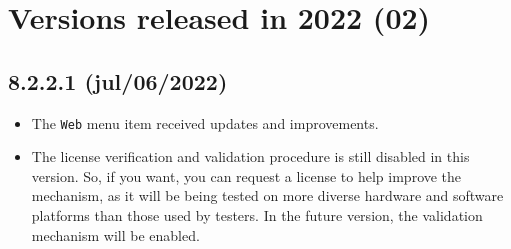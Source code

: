 
\hypertarget{2022}{}
\section{Versions released in 2022 (02)}

\subsection*{8.2.2.1 (jul/06/2022)}
\begin{itemize}
  \item The \texttt{Web} menu item received updates and improvements.
  \item The license verification and validation procedure is still disabled in this version.
    So, if you want, you can request a license to help improve the mechanism,
    as it will be being tested on more diverse hardware and software platforms than
    those used by testers. In the future version, the validation mechanism will be enabled.
\end{itemize}

